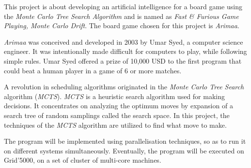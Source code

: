 This project is about developing an artificial intelligence for a board game using the \emph{Monte Carlo Tree Search Algorithm} and is named as \emph{Fast \& Furious Game Playing, Monte Carlo Drift}. The board game chosen for this project is \emph{Arimaa}.
\newline

\emph{Arimaa} was conceived and developed in 2003 by Umar Syed, a computer science engineer. It was intentionally made difficult for computers to play, while following simple rules. Umar Syed offered a prize of 10,000 USD to the first program that could beat a human player in a game of 6 or more matches.
\newline

A revolution in scheduling algorithms originated in the \emph{Monte Carlo Tree Search} algorithm (\emph{MCTS}). \emph{MCTS} is a heuristic search algorithm used for making decisions. It concentrates on analyzing the optimum moves by expansion of a search tree of random samplings called the search space. In this project, the techniques of the \emph{MCTS} algorithm are utilized to find what move to make.
\newline

The program will be implemented using parallelisation techniques, so as to run it on different systems simultaneously. Eventually, the program will be executed on Grid'5000, on a set of cluster of multi-core machines.
